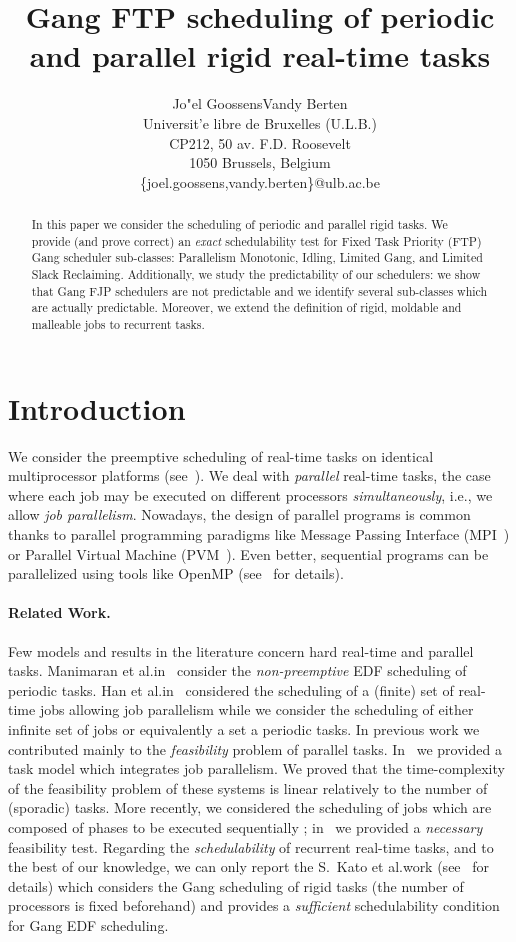 \documentclass[a4paper]{article}
\title{Gang FTP scheduling of periodic \\and parallel rigid real-time tasks}
\author{Jo\a"el Goossens\hfill Vandy Berten\\
Universit\a'e libre de Bruxelles (U.L.B.)\\
CP212, 50 av. F.D. Roosevelt\\
1050 Brussels, Belgium\\
\{joel.goossens,vandy.berten\}@ulb.ac.be}
\begin{document}
\maketitle
\thispagestyle{empty}


\begin{abstract}
In this paper we consider the scheduling of periodic and parallel rigid tasks. We provide (and prove correct) an \emph{exact} schedulability test for Fixed Task Priority (FTP) Gang scheduler sub-classes: Parallelism Monotonic, Idling, Limited Gang, and Limited Slack Reclaiming. Additionally, we study the predictability of our schedulers: we show that Gang FJP schedulers are not predictable and we identify several sub-classes which are actually predictable. Moreover, we extend the definition of rigid, moldable and malleable jobs to recurrent tasks.  
\end{abstract}

\section{Introduction}\label{sec:intro}
We consider the preemptive scheduling of real-time tasks on identical multiprocessor platforms (see~\cite{baker2,Baker2005An-analysis-of-}). We deal with \emph{parallel} real-time tasks, the case where each job may be executed on different processors \emph{simultaneously}, i.e., we allow \emph{job parallelism}. Nowadays, the design of parallel programs is common thanks to parallel programming paradigms like Message Passing Interface (MPI~\cite{Gorlatch1998A-Generic-MPI-I,Lusk1999Using-MPI-:-por}) or Parallel Virtual Machine (PVM~\cite{Sunderam1990PVM:-A-Framewor,Geist1994PVM:-Parallel-V}). Even better, sequential programs can be parallelized using tools like OpenMP (see~\cite{355074} for details).
\paragraph{Related Work.}
Few models and results in the literature concern hard real-time and parallel tasks. \mbox{Manimaran} et al.\@ in~\cite{mani98} consider the \emph{non-preemptive} EDF scheduling of periodic tasks. \mbox{Han} et al.\@ in~\cite{han89} considered the scheduling of a
(finite) set of real-time jobs allowing job parallelism while we consider the scheduling of either infinite set of jobs or equivalently a set a periodic tasks. In previous work we contributed mainly to the \emph{feasibility} problem of parallel tasks. In~\cite{CCG06b} we provided a task model which integrates job parallelism. We proved that the time-complexity of the feasibility problem of these systems is linear relatively to the number of (sporadic) tasks. More recently, we considered the scheduling of jobs which are composed of phases to be executed sequentially ; in~\cite{Berten2009Feasibility-Tes} we provided a \emph{necessary} feasibility test. Regarding the \emph{schedulability} of recurrent real-time tasks, and to the best of our knowledge, we can only report the S.~Kato et al.\@ work (see~\cite{kato2009gang} for details) which considers the Gang scheduling of rigid tasks (the number of processors is fixed beforehand) and provides a \emph{sufficient} schedulability condition for Gang EDF scheduling.
\end{document}
